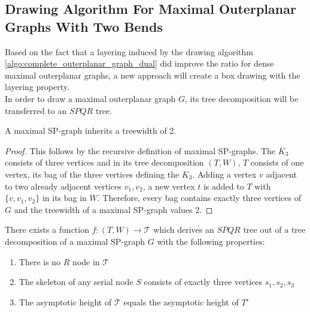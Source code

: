 \subsection{Drawing Algorithm For Maximal Outerplanar Graphs With Two Bends}

Based on the fact that a layering induced by the drawing algorithm \ref{algo:complete_outerplanar_graph_dual} did improve the ratio for dense maximal outerplanar graphs, a new approach will create a box drawing with the layering property.\\
In order to draw a maximal outerplanar graph $G$, its tree decomposition will be transferred to an $SPQR$ tree.
\begin{lemma}
	A maximal SP-graph inherits a treewidth of 2.
\end{lemma}
\begin{proof}
	This follows by the recursive definition of maximal SP-graphs. The $K_3$ consists of three vertices and in its tree decomposition $(T,W)$, $T$ consists of one vertex, its bag of the three vertices defining the $K_3$. Adding a vertex $v$ adjacent to two already adjacent vertices $v_1,v_2$, a new vertex $t$ is added to $T$ with $\{v,v_1,v_2\}$ in its bag in $W$. Therefore, every bag contains exactly three vertices of $G$ and the treewidth of a maximal SP-graph values 2.
\end{proof}
\begin{lemma}
	There exists a function $f: (T,W) \to \mathcal{T}$ which derives an $SPQR$ tree out of a tree decomposition of a maximal SP-graph $G$ with the following properties:
	\begin{enumerate}
		\item There is no $R$ node in $\mathcal{T}$
		\item The skeleton of any serial node $S$ consists of exactly three vertices $s_1,s_2,s_3$
		\item The asymptotic height of $\mathcal{T}$ equals the asymptotic height of $T'$		
	\end{enumerate}\label{l:tree_decomp_to_SPQR}
\end{lemma}
